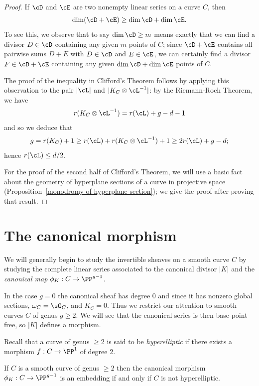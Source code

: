 \begin{proof}
If $\cD$ and $\cE$ are two nonempty linear series on a curve $C$, then
$$
\dim(\cD + \cE) \geq \dim \cD + \dim \cE.
$$
To see this, we observe that to say $\dim \cD \geq m$ means exactly that we can find a divisor $D \in \cD$ containing any given $m$ points of $C$; since $\cD + \cE$ contains all pairwise sums $D + E$ with $D \in \cD$ and $E \in \cE$, we can certainly find a divisor $F \in \cD + \cE$ containing any given $\dim \cD + \dim \cE$ points of $C$.

The proof of the inequality in Clifford's Theorem follows  by applying this observation to the pair $|\cL|$ and $|K_C\otimes \cL^{-1}|$: by 
the Riemann-Roch Theorem, we have
$$
r(K_C\otimes \cL^{-1}) = r(\cL) +g - d - 1
$$
and so we deduce that
$$
g = r(K_C) + 1 \geq r(\cL) + r(K_C\otimes \cL^{-1}) + 1 \geq 2r(\cL) +g - d;
$$
hence $r(\cL) \leq d/2$.

For the proof of the second half of Clifford's Theorem, we will use a basic fact about the geometry of hyperplane sections of a curve in projective space (Proposition~\ref{monodromy of hyperplane section}); we give the proof after proving that result.
\end{proof}



\section{The canonical morphism}

We will generally begin to study the invertible sheaves on a smooth curve $C$ by studying the complete linear series associated to the canonical divisor $|K|$ and the \emph{canonical map}
 $\phi_K : C \to \PP^{g-1}$. 
 
 In the case $g=0$ the canonical sheaf has degree 0 and since it has nonzero global sections, 
 $\omega_C = \sO_C$, and $K_C = 0$. Thus we restrict our attention to smooth curves $C$ of genus $g\geq 2$. We will see
 that the canonical series is then base-point free, so $|K|$ defines a morphism.

Recall that a curve of genus $\geq 2$
is said to be \emph{hyperelliptic} if there exists a morphism $f: C \to \PP^1$ of degree 2. 


\begin{theorem}\label{canonical series is very ample}
If $C$ is a smooth curve of genus $\geq 2$ then the canonical morphism $\phi_K : C \to \PP^{g-1}$ is an embedding if and only if $C$ is not hyperelliptic. 
\end{theorem}

